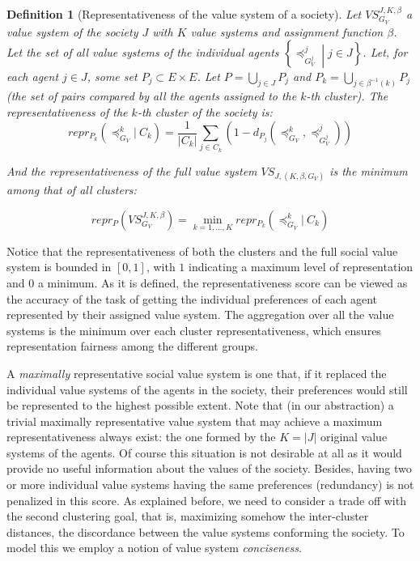 \documentclass{ecai}
\newtheorem{definition}{Definition}
\newcommand{\abs}[1]{{\left|#1\right|}}
\begin{document}
\begin{definition}[Representativeness of the value system of a society]\label{def:representativeness}
    Let $VS^{J,K,\beta}_{G_V}$ a value system of the society $J$ with $K$ value systems and assignment function $\beta$. Let the set of all value systems of the individual agents $\left\{\preccurlyeq^j_{G^j_V} \middle| j \in J\right\}$. Let, for each agent $j\in J$, some set $P_j \subset E\times E$. Let $P = \bigcup_{j\in J} P_j$ and $P_k = \bigcup_{j\in \beta^{-1}(k)}P_j$ (the set of pairs compared by all the agents assigned to the $k$-th cluster). The representativeness of the $k$-th cluster of the society is: 
    $$repr_{P_k}\left(\preccurlyeq_{G_V}^k|\ C_k\right) = \frac{1}{\abs{C_k}}\sum_{j\in C_k} \left(1 - d_{P_j}\left(\preccurlyeq_{G_V}^{k}, \preccurlyeq_{G^j_V}^{j}\right)\right)$$
    
    And the representativeness of the full value system $VS_{J,(K,\beta,G_V)}$ is the minimum among that of all clusters:

    $$repr_P\left(VS^{J,K,\beta}_{G_V}\right) = \min_{k=1,\dots,K} repr_{P_k}\left(\preccurlyeq_{G_V}^k|\ C_k\right)$$

   
\end{definition}

 Notice that the representativeness of both the clusters and the full social value system is bounded in $[0,1]$, with $1$ indicating a maximum level of representation and $0$ a minimum. As it is defined, the representativeness score can be viewed as the accuracy of the task of getting the individual preferences of each agent represented by their assigned value system. The aggregation over all the value systems is the minimum over each cluster representativeness, which ensures representation fairness among the different groups. 

A \textit{maximally} representative social value system is one that, if it replaced the individual value systems of the agents in the society, their preferences would still be represented to the highest possible extent. Note that (in our abstraction) a trivial maximally representative value system that may achieve a maximum representativeness always exist: the one formed by the $K=\abs{J}$ original value systems of the agents. Of course this situation is not desirable at all as it would provide no useful information about the values of the society. Besides, having two or more individual value systems having the same preferences (redundancy) is not penalized in this score. As explained before, we need to consider a trade off with the second clustering goal, that is, maximizing somehow the inter-cluster distances, the discordance between the value systems conforming the society. To model this we employ a notion of value system \textit{conciseness}.
\end{document}
